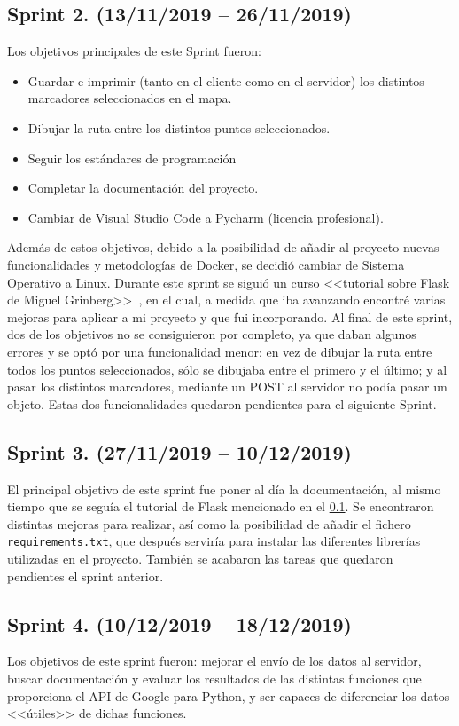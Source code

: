 \subsection{Sprint 2. (13/11/2019 -- 26/11/2019)} \label{sprint2}
Los objetivos principales de este Sprint fueron: 
\begin{itemize}
	\item Guardar e imprimir (tanto en el cliente como en el servidor) los distintos marcadores seleccionados en el mapa.
	\item Dibujar la ruta entre los distintos puntos seleccionados.
	\item Seguir los estándares de programación
	\item Completar la documentación del proyecto.
	\item Cambiar de Visual Studio Code a Pycharm (licencia profesional).
\end{itemize}
Además de estos objetivos, debido a la posibilidad de añadir al proyecto nuevas funcionalidades y metodologías de Docker, se decidió cambiar de Sistema Operativo a Linux.
Durante este sprint se siguió un curso <<tutorial sobre Flask de Miguel Grinberg>>~\cite{grinberg-mega}, en el cual, a medida que iba avanzando encontré varias mejoras para aplicar a mi proyecto y que fui incorporando.
Al final de este sprint, dos de los objetivos no se consiguieron por completo, ya que daban algunos errores y se optó por una funcionalidad menor: en vez de dibujar la ruta entre todos los puntos seleccionados, sólo se dibujaba entre el primero y el último; y al pasar los distintos marcadores, mediante un POST al servidor no podía pasar un objeto. Estas dos funcionalidades quedaron pendientes para el siguiente Sprint.

\subsection{Sprint 3. (27/11/2019 -- 10/12/2019)}
El principal objetivo de este sprint fue poner al día la documentación, al mismo tiempo que se seguía el tutorial de Flask mencionado en el \ref{sprint2}.
Se encontraron distintas mejoras para realizar, así como la posibilidad de añadir el fichero \texttt{requirements.txt}, que después serviría para instalar las diferentes librerías utilizadas en el proyecto.
También se acabaron las tareas que quedaron pendientes el sprint anterior.

\subsection{Sprint 4. (10/12/2019 -- 18/12/2019)}
Los objetivos de este sprint fueron: mejorar el envío de los datos al servidor, buscar documentación y evaluar los resultados de las distintas funciones que proporciona el API de Google para Python, y ser capaces de diferenciar los datos <<útiles>> de dichas funciones.

